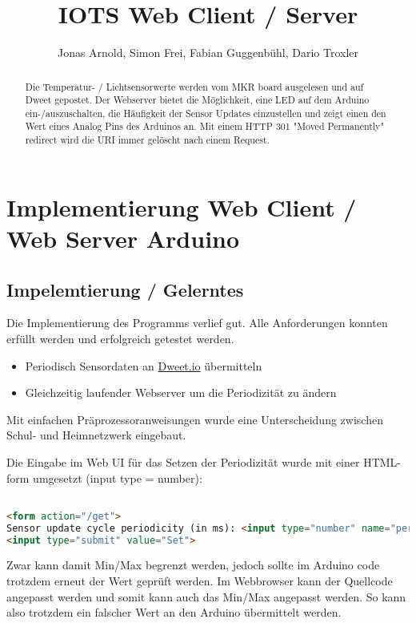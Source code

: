 \documentclass{article}
\title{IOTS Web Client / Server}
\author{Jonas Arnold, Simon Frei, Fabian Guggenbühl, Dario Troxler}
\begin{document}
\maketitle

\begin{abstract}
Die Temperatur- / Lichtsensorwerte werden vom MKR board ausgelesen und auf Dweet gepostet. Der Webserver bietet die Möglichkeit, eine LED auf dem Arduino ein-/auszuschalten, die Häufigkeit der Sensor Updates einzustellen und zeigt einen den Wert eines Analog Pins des Arduinos an. Mit einem HTTP 301 "Moved Permanently" redirect wird die URI immer gelöscht nach einem Request.
\end{abstract}

\section{Implementierung Web Client / Web Server Arduino}

\subsection{Impelemtierung / Gelerntes}

Die Implementierung des Programms verlief gut. Alle Anforderungen konnten erfüllt werden und erfolgreich getestet werden.
\begin{itemize}
\item Periodisch Sensordaten an \href{https://dweet.io/follow/IOTS2021}{Dweet.io} übermitteln
\item Gleichzeitig laufender Webserver um die Periodizität zu ändern
\end{itemize}

Mit einfachen Präprozessoranweisungen wurde eine Unterscheidung zwischen Schul- und Heimnetzwerk eingebaut.

Die Eingabe im Web UI für das Setzen der Periodizität wurde mit einer HTML-form umgesetzt (input type = number):
\begin{lstlisting}[style=CStyle, language=html, caption=Vom Arduino generierter HTML code]  % Start your code-block

<form action="/get">
Sensor update cycle periodicity (in ms): <input type="number" name="periodMs" min="2000" max="60000" value="10000">
<input type="submit" value="Set">

\end{lstlisting}
Zwar kann damit Min/Max begrenzt werden, jedoch sollte im Arduino code trotzdem erneut der Wert geprüft werden. Im Webbrowser kann der Quellcode angepasst werden und somit kann auch das Min/Max angepasst werden. So kann also trotzdem ein falscher Wert an den Arduino übermittelt werden.
\end{document}
